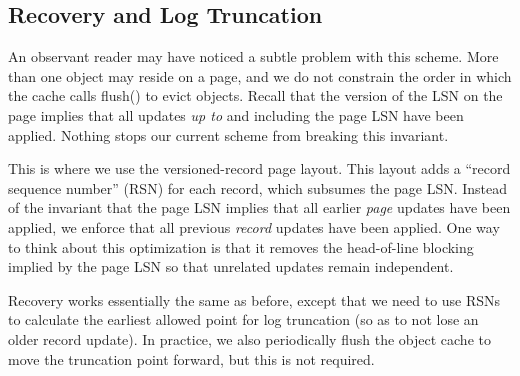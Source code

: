 \documentclass[10pt,letterpaper,twocolumn,english]{article}
\newcommand{\yad}{LLADD\xspace}
\begin{document}
\subsection{Recovery and Log Truncation}

An observant reader may have noticed a subtle problem with this
scheme.  More than one object may reside on a page, and we do not
constrain the order in which the cache calls flush() to evict objects.
Recall that the version of the LSN on the page implies that all
updates {\em up to} and including the page LSN have been applied.
Nothing stops our current scheme from breaking this invariant.  

This is where we use the versioned-record page layout. This layout adds a
``record sequence number'' (RSN) for each record, which subsumes the
page LSN.  Instead of the invariant that the page LSN implies that all
earlier {\em page} updates have been applied, we enforce that all
previous {\em record} updates have been applied.  One way to think about
this optimization is that it removes the head-of-line blocking implied
by the page LSN so that unrelated updates remain independent.

Recovery works essentially the same as before, except that we need to
use RSNs to calculate the earliest allowed point for log truncation
(so as to not lose an older record update).  In practice, we
also periodically flush the object cache to move the truncation point
forward, but this is not required.



\end{document}
